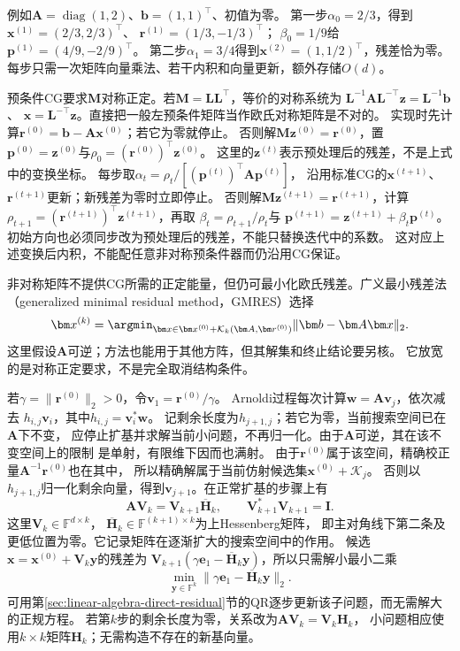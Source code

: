 例如$\bm A=\operatorname{diag}(1,2)$、$\bm b=(1,1)^\top$、初值为零。
第一步$\alpha_0=2/3$，得到
$\bm x^{(1)}=(2/3,2/3)^\top$、
$\bm r^{(1)}=(1/3,-1/3)^\top$；
$\beta_0=1/9$给$\bm p^{(1)}=(4/9,-2/9)^\top$。
第二步$\alpha_1=3/4$得到$\bm x^{(2)}=(1,1/2)^\top$，残差恰为零。
每步只需一次矩阵向量乘法、若干内积和向量更新，额外存储$O(d)$。

预条件CG要求$\bm M$对称正定。若$\bm M=\bm L\bm L^\top$，等价的对称系统为
$\bm L^{-1}\bm A\bm L^{-\top}\bm z=\bm L^{-1}\bm b$、
$\bm x=\bm L^{-\top}\bm z$。直接把一般左预条件矩阵当作欧氏对称矩阵是不对的。
实现时先计算$\bm r^{(0)}=\bm b-\bm A\bm x^{(0)}$；若它为零就停止。
否则解$\bm M\bm z^{(0)}=\bm r^{(0)}$，置
$\bm p^{(0)}=\bm z^{(0)}$与$\rho_0=(\bm r^{(0)})^\top\bm z^{(0)}$。
这里的$\bm z^{(t)}$表示预处理后的残差，不是上式中的变换坐标。
每步取$\alpha_t=\rho_t/[(\bm p^{(t)})^\top\bm A\bm p^{(t)}]$，
沿用标准CG的$\bm x^{(t+1)}$、$\bm r^{(t+1)}$更新；新残差为零时立即停止。
否则解$\bm M\bm z^{(t+1)}=\bm r^{(t+1)}$，计算
$\rho_{t+1}=(\bm r^{(t+1)})^\top\bm z^{(t+1)}$，再取
$\beta_t=\rho_{t+1}/\rho_t$与
$\bm p^{(t+1)}=\bm z^{(t+1)}+\beta_t\bm p^{(t)}$。
初始方向也必须同步改为预处理后的残差，不能只替换迭代中的系数。
这对应上述变换后内积，不能配任意非对称预条件器而仍沿用CG保证。


非对称矩阵不提供CG所需的正定能量，但仍可最小化欧氏残差。广义最小残差法
（generalized minimal residual method，GMRES）选择
\[
 \bm x^{(k)}
 =\argmin_{\bm x\in\bm x^{(0)}+\mathcal K_k(\bm A,\bm r^{(0)})}
      \lVert\bm b-\bm A\bm x\rVert_2.
\]
这里假设$\bm A$可逆；方法也能用于其他方阵，但其解集和终止结论要另核。
它放宽的是对称正定要求，不是完全取消结构条件。

若$\gamma=\lVert\bm r^{(0)}\rVert_2>0$，令$\bm v_1=\bm r^{(0)}/\gamma$。
Arnoldi过程每次计算$\bm w=\bm A\bm v_j$，依次减去
$h_{i,j}\bm v_i$，其中$h_{i,j}=\bm v_i^*\bm w$。
记剩余长度为$h_{j+1,j}$；若它为零，当前搜索空间已在$\bm A$下不变，
应停止扩基并求解当前小问题，不再归一化。由于$\bm A$可逆，其在该不变空间上的限制
是单射，有限维下因而也满射。
由于$\bm r^{(0)}$属于该空间，精确校正量$\bm A^{-1}\bm r^{(0)}$也在其中，
所以精确解属于当前仿射候选集$\bm x^{(0)}+\mathcal K_j$。
否则以$h_{j+1,j}$归一化剩余向量，得到$\bm v_{j+1}$。在正常扩基的步骤上有
\[
 \bm A\bm V_k=\bm V_{k+1}\overline{\bm H}_k,
 \qquad
 \bm V_{k+1}^*\bm V_{k+1}=\bm I.
\]
这里$\bm V_k\in\mathbb F^{d\times k}$，
$\overline{\bm H}_k\in\mathbb F^{(k+1)\times k}$为上Hessenberg矩阵，
即主对角线下第二条及更低位置为零。它记录矩阵在逐渐扩大的搜索空间中的作用。
候选$\bm x=\bm x^{(0)}+\bm V_k\bm y$的残差为
$\bm V_{k+1}(\gamma\bm e_1-\overline{\bm H}_k\bm y)$，所以只需解小最小二乘
\[
 \min_{\bm y\in\mathbb F^k}
 \lVert\gamma\bm e_1-\overline{\bm H}_k\bm y\rVert_2.
\]
可用第\ref{sec:linear-algebra-direct-residual}节的QR逐步更新该子问题，而无需解大的正规方程。
若第$k$步的剩余长度为零，关系改为$\bm A\bm V_k=\bm V_k\bm H_k$，
小问题相应使用$k\times k$矩阵$\bm H_k$；无需构造不存在的新基向量。

